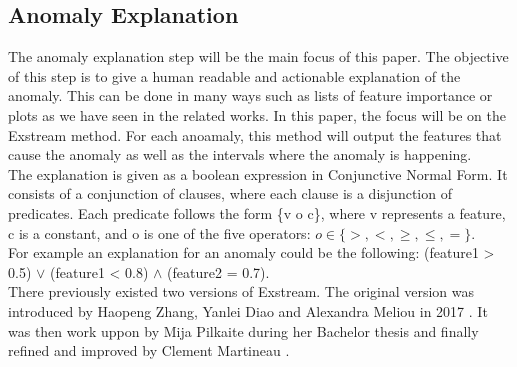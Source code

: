 \documentclass[oneside, a4paper, onecolumn, 11pt]{article}
\begin{document}
\subsection{Anomaly Explanation}
The anomaly explanation step will be the main focus of this paper. The objective of this step is to give a human readable and actionable explanation of the anomaly. This can be done in many ways such as lists of feature importance or plots as we have seen in the related works. In this paper, the focus will be on the Exstream method. For each anoamaly, this method will output the features that cause the anomaly as well as the intervals where the anomaly is happening.\\
The explanation is given as a boolean expression in Conjunctive Normal Form. It consists of a conjunction of clauses, where each clause is a disjunction of predicates. Each predicate follows the form \{v o c\}, where v represents a feature, c is a constant, and o is one of the five operators: $o\in\{>, <, \geq, \leq, =\}$.\\
For example an explanation for an anomaly could be the following: (feature1 > 0.5) $\lor$ (feature1 < 0.8) $\land$ (feature2 = 0.7).\\
There previously existed two versions of Exstream. The original version was introduced by Haopeng Zhang, Yanlei Diao and Alexandra Meliou  in 2017 \cite{Exstream}. It was then work uppon by Mija Pilkaite during her Bachelor thesis \cite{MijaExstream} and finally refined and improved by Clement Martineau \cite{ClementExstream}.\\
\end{document}
